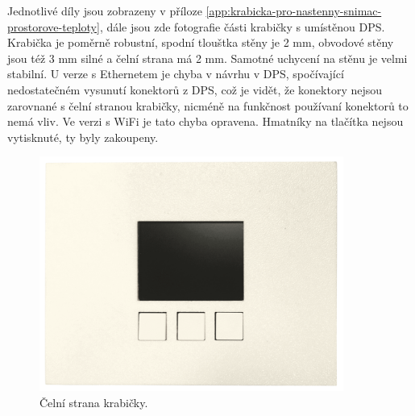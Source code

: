 Jednotlivé díly jsou zobrazeny v příloze \ref{app:krabicka-pro-nastenny-snimac-prostorove-teploty}, dále jsou zde fotografie části krabičky s umístěnou DPS. Krabička je poměrně robustní, spodní tlouštka stěny je 2 mm, obvodové stěny jsou též 3 mm silné a čelní strana má 2 mm. Samotné uchycení na stěnu je velmi stabilní. U verze s Ethernetem je chyba v návrhu v DPS, spočívající nedostatečném vysunutí konektorů z DPS, což je vidět, že konektory nejsou zarovnané s čelní stranou krabičky, nicméně na funkčnost používaní konektorů to nemá vliv. Ve verzi s WiFi je tato chyba opravena. Hmatníky na tlačítka nejsou vytisknuté, ty byly zakoupeny.
 
\begin{figure}[H]
    \centering
    \includegraphics[width=0.89\textwidth]{images/krabicka-nastenny-snimac-prostorove-teploty/krabicka-nastenny-snimac-prostorove-teploty-predni-strana-displej.png}
   \caption{Čelní strana krabičky.}
    \label{fig:krabicka-nastenny-snimac-prostorove-teploty-predni-strana-displej}
\end{figure}
